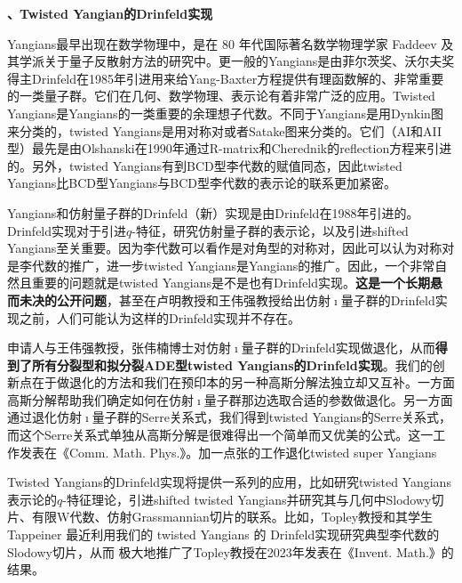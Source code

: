 \documentclass[12pt,UTF8,AutoFakeBold=4,a4paper]{ctexart}
\begin{document}
\medskip

\textbf{、Twisted Yangian的Drinfeld实现}

Yangians最早出现在数学物理中，是在 80 年代国际著名数学物理学家 Faddeev 及其学派关于量子反散射方法的研究中。更一般的Yangians是由菲尔茨奖、沃尔夫奖得主Drinfeld在1985年引进用来给Yang-Baxter方程提供有理函数解的、非常重要的一类量子群。它们在几何、数学物理、表示论有着非常广泛的应用。Twisted Yangians是Yangians的一类重要的余理想子代数。不同于Yangians是用Dynkin图来分类的，twisted Yangians是用对称对或者Satake图来分类的。它们（AI和AII型）最先是由Olshanski在1990年通过R-matrix和Cherednik的reflection方程来引进的。另外，twisted Yangians有到BCD型李代数的赋值同态，因此twisted Yangians比BCD型Yangians与BCD型李代数的表示论的联系更加紧密。

Yangians和仿射量子群的Drinfeld（新）实现是由Drinfeld在1988年引进的。Drinfeld实现对于引进$q$-特征，研究仿射量子群的表示论，以及引进shifted Yangians至关重要。因为李代数可以看作是对角型的对称对，因此可以认为对称对是李代数的推广，进一步twisted Yangians是Yangians的推广。因此，一个非常自然且重要的问题就是twisted Yangians是不是也有Drinfeld实现。\textbf{这是一个长期悬而未决的公开问题}，甚至在卢明教授和王伟强教授给出仿射$\imath$量子群的Drinfeld实现之前，人们可能认为这样的Drinfeld实现并不存在。


申请人与王伟强教授，张伟楠博士对仿射$\imath$量子群的Drinfeld实现做退化，从而\textbf{得到了所有分裂型和拟分裂ADE型twisted Yangians的Drinfeld实现}。我们的创新点在于做退化的方法和我们在预印本的另一种高斯分解法独立却又互补。一方面高斯分解帮助我们确定如何在仿射$\imath$量子群那边选取合适的参数做退化。另一方面通过退化仿射$\imath$量子群的Serre关系式，我们得到twisted Yangians的Serre关系式，而这个Serre关系式单独从高斯分解是很难得出一个简单而又优美的公式。这一工作发表在《Comm. Math. Phys.》。{\color{red}加一点张的工作退化twisted super Yangians}

Twisted Yangians的Drinfeld实现将提供一系列的应用，比如研究twisted Yangians表示论的$q$-特征理论，引进shifted twisted Yangians并研究其与几何中Slodowy切片、有限W代数、仿射Grassmannian切片的联系。比如，Topley教授和其学生Tappeiner 最近利用我们的 twisted Yangians 的 Drinfeld实现研究典型李代数的Slodowy切片，从而 极大地推广了Topley教授在2023年发表在《Invent. Math.》的结果。
\end{document}
